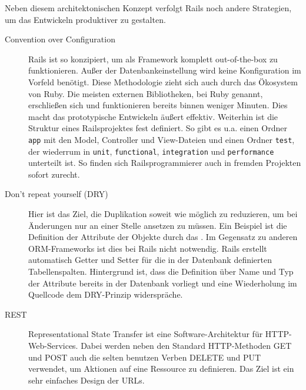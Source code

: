 Neben diesem architektonischen Konzept verfolgt Rails noch andere Strategien, um das Entwickeln produktiver zu gestalten.
\begin{description}
 \item[Convention over Configuration] Rails ist so konzipiert, um als Framework komplett out-of-the-box zu funktionieren. Außer der Datenbankeinstellung wird keine Konfiguration im Vorfeld benötigt. Diese Methodologie zieht sich auch durch das Ökosystem von Ruby. Die meisten externen Bibliotheken, bei Ruby  genannt, erschließen sich und funktionieren bereits binnen weniger Minuten. Dies macht das prototypische Entwickeln äußert effektiv. Weiterhin ist die Struktur eines Railsprojektes fest definiert. So gibt es u.a. einen Ordner \texttt{app} mit den Model, Controller und View-Dateien und einen Ordner \texttt{test}, der wiederrum in \texttt{unit}, \texttt{functional}, \texttt{integration} und \texttt{performance} unterteilt ist. So finden sich Railsprogrammierer auch in fremden Projekten sofort zurecht.
 \item[Don't repeat yourself (DRY)] Hier ist das Ziel, die Duplikation soweit wie möglich zu reduzieren, um bei Änderungen nur an einer Stelle ansetzen zu müssen. Ein Beispiel ist die Definition der Attribute der Objekte durch das . Im Gegensatz zu anderen ORM-Frameworks ist dies bei Rails nicht notwendig. Rails erstellt automatisch Getter und Setter für die in der Datenbank definierten Tabellenspalten. Hintergrund ist, dass die Definition über Name und Typ der Attribute bereits in der Datenbank vorliegt und eine Wiederholung im Quellcode dem DRY-Prinzip widerspräche.
 \item[REST] Representational State Transfer ist eine Software-Architektur für HTTP-Web-Services. Dabei werden neben den Standard HTTP-Methoden GET und POST auch die selten benutzen Verben DELETE und PUT verwendet, um Aktionen auf eine Ressource zu definieren. Das Ziel ist ein sehr einfaches Design der URLs.


\end{description}
